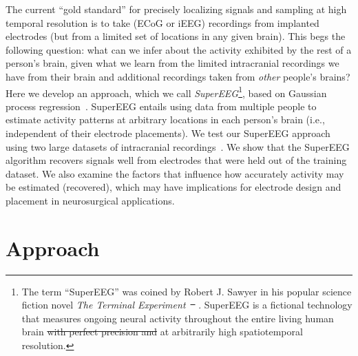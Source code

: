 \documentclass[10pt]{article}
\providecommand{\DIFaddtex}[1]{{\protect\color{blue}\uwave{#1}}} %
\providecommand{\DIFdeltex}[1]{{\protect\color{red}\sout{#1}}}                      %
\providecommand{\DIFaddbegin}{} %
\providecommand{\DIFaddend}{} %
\providecommand{\DIFdelbegin}{} %
\providecommand{\DIFdelend}{} %
\providecommand{\DIFadd}[1]{\texorpdfstring{\DIFaddtex{#1}}{#1}} %
\providecommand{\DIFdel}[1]{\texorpdfstring{\DIFdeltex{#1}}{}} %
\newcommand{\DIFscaledelfig}{0.5}
\newlength{\DIFdelgraphicswidth} %
\newlength{\DIFdelgraphicsheight} %
\newcommand{\DIFaddincludegraphics}[2][]{{\color{blue}\fbox{\DIFOincludegraphics[#1]{#2}}}} %
\newcommand{\DIFdelincludegraphics}[2][]{%
\sbox{\DIFdelgraphicsbox}{\DIFOincludegraphics[#1]{#2}}%
\settoboxwidth{\DIFdelgraphicswidth}{\DIFdelgraphicsbox} %
\settoboxtotalheight{\DIFdelgraphicsheight}{\DIFdelgraphicsbox} %
\scalebox{\DIFscaledelfig}{%
\parbox[b]{\DIFdelgraphicswidth}{\usebox{\DIFdelgraphicsbox}\\[-\baselineskip] \rule{\DIFdelgraphicswidth}{0em}}\llap{\resizebox{\DIFdelgraphicswidth}{\DIFdelgraphicsheight}{%
\setlength{\unitlength}{\DIFdelgraphicswidth}%
\begin{picture}(1,1)%
\thicklines\linethickness{2pt} %
{\color[rgb]{1,0,0}\put(0,0){\framebox(1,1){}}}%
{\color[rgb]{1,0,0}\put(0,0){\line( 1,1){1}}}%
{\color[rgb]{1,0,0}\put(0,1){\line(1,-1){1}}}%
\end{picture}%
}\hspace*{3pt}}} %
} %
\DeclareRobustCommand{\DIFaddbegin}{\DIFOaddbegin \let\includegraphics\DIFaddincludegraphics} %
\DeclareRobustCommand{\DIFaddend}{\DIFOaddend \let\includegraphics\DIFOincludegraphics} %
\DeclareRobustCommand{\DIFdelbegin}{\DIFOdelbegin \let\includegraphics\DIFdelincludegraphics} %
\DeclareRobustCommand{\DIFdelend}{\DIFOaddend \let\includegraphics\DIFOincludegraphics} %
\begin{document}
The current ``gold standard'' for precisely localizing signals and sampling at
high temporal resolution is to take (ECoG or iEEG) recordings from implanted
electrodes (but from a limited set of locations in any given brain).  This begs
the following question: what can we infer about the activity exhibited by the
rest of a person's brain, given what we learn from the limited intracranial
recordings we have from their brain and additional recordings taken from
\textit{other} people's brains?  Here we develop an approach, which we call
\textit{SuperEEG}\footnote{The term ``SuperEEG'' was coined by Robert J. Sawyer
in his popular science fiction novel \textit{The Terminal
Experiment}~\DIFdelbegin \DIFdel{\mbox{%
\cite{Sawy95}}\hspace{0pt}%
}\DIFdelend \DIFaddbegin \DIFadd{\mbox{%
\citep{Sawy95}}\hspace{0pt}%
}\DIFaddend .  SuperEEG is a fictional technology that measures
ongoing neural activity throughout the entire living human brain \DIFdelbegin \DIFdel{with perfect precision and
  }\DIFdelend at arbitrarily
high spatiotemporal resolution.}, based on Gaussian process
regression~\citep{Rasm06}.  SuperEEG entails using data from multiple people to
estimate activity patterns at arbitrary locations in each person's brain (i.e.,
independent of their electrode placements).  We test our SuperEEG approach using
two large datasets of intracranial recordings~\citep{SedeEtal03, SedeEtal07a,
SedeEtal07b, MannEtal11, MannEtal12, EzzyEtal17, HoraEtal17, KragEtal17,
KuceEtal17, LinEtal17, SoloEtal18, WeidEtal18, EzzyEtal18, KuceEtal18}.  We show
that the SuperEEG algorithm recovers signals well from electrodes that were held
out of the training dataset.  We also examine the factors that influence how
accurately activity may be estimated (recovered), which may have implications
for electrode design and placement in neurosurgical applications.

\section*{Approach}
\DIFaddbegin 
\end{document}
